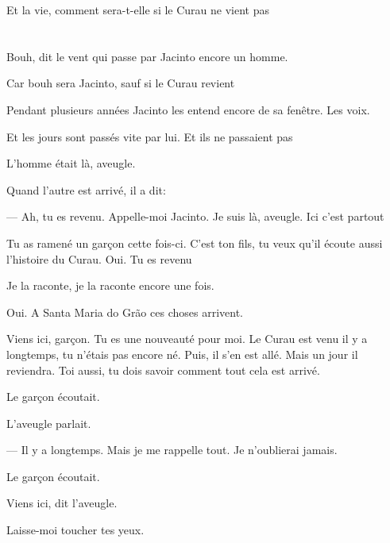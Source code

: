 Et la vie, comment sera-t-elle si le Curau ne vient pas

\pagebreak
\pagecolor{black}

\chapter*{}
\pagecolor{black}\afterpage{\nopagecolor}


\movetoevenpage

\vspace*{4cm}

Bouh, dit le vent qui passe par Jacinto encore un homme.

Car bouh sera Jacinto, sauf si le Curau revient

\pagebreak

\vspace*{4cm}

Pendant plusieurs années Jacinto les entend encore de sa fenêtre. Les
voix.

Et les jours sont passés vite par lui. Et ils ne passaient pas

\clearpage
\thispagestyle{empty}
\movetooddpage

\vspace*{4cm}

L'homme était là, aveugle.

Quand l'autre est arrivé, il a dit:

--- Ah, tu es revenu. Appelle-moi Jacinto. Je suis là, aveugle. Ici c'est
  partout

Tu as ramené un garçon cette fois-ci. C'est ton fils, tu veux qu'il
écoute aussi l'histoire du Curau. Oui. Tu es revenu

Je la raconte, je la raconte encore une fois.

Oui. A Santa Maria do Grão ces choses arrivent.

Viens ici, garçon. Tu es une nouveauté pour moi. Le Curau est venu il y
a longtemps, tu n'étais pas encore né. Puis, il s'en est allé. Mais un
jour il reviendra. Toi aussi, tu dois savoir comment tout cela est
arrivé.

Le garçon écoutait.

L'aveugle parlait.

--- Il y a longtemps. Mais je me rappelle tout. Je n'oublierai jamais.

Le garçon écoutait.

Viens ici, dit l'aveugle.

Laisse-moi toucher tes yeux.


